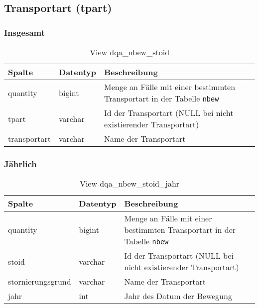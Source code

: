 \subsection{Transportart (tpart)} \label{subsec:bewTpart}

\subsubsection{Insgesamt} \label{subsubsec:bewTpartI}

\begin{table}[ht]
	\centering   
	\caption{View dqa\_nbew\_stoid}
	\label{tab:bewTpartI}
	\begin{tabular}{||l|l|p{10cm}||}   		
		\hline
		Spalte & Datentyp & Beschreibung \\ [0.5ex]
		\hline\hline
		quantity & bigint & Menge an Fälle mit einer bestimmten Transportart in der Tabelle \texttt{nbew} \\
		\hline
		tpart & varchar & Id der Transportart (NULL bei nicht existierender Transportart)\\
		\hline
		transportart & varchar & Name der Transportart \\
		\hline
	\end{tabular}
\end{table}

\newpage

\subsubsection{Jährlich} \label{subsubsec:bewTpartJ}

\begin{table}[ht]
	\centering   
	\caption{View dqa\_nbew\_stoid\_jahr}
	\label{tab:bewTpartJ}
	\begin{tabular}{||l|l|p{10cm}||}
		\hline
		Spalte & Datentyp & Beschreibung \\ [0.5ex]
		\hline\hline
		quantity & bigint & Menge an Fälle mit einer bestimmten Transportart in der Tabelle \texttt{nbew}\\
		\hline
		stoid & varchar & Id der Transportart (NULL bei nicht existierender Transportart)\\
		\hline
		stornierungsgrund & varchar & Name der Transportart \\
		\hline
		jahr & int &  Jahr des Datum der Bewegung \\
		\hline		
	\end{tabular}
\end{table}

